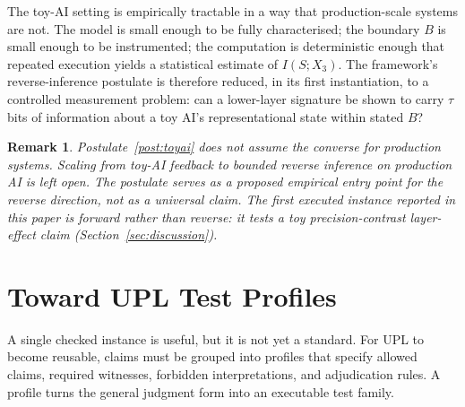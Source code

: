 \documentclass[11pt, a4paper]{article}
\theoremstyle{upldef}
\newtheorem{remark}{Remark}
\begin{document}
The toy-AI setting is empirically tractable in a way that
production-scale systems are not. The model is small enough to be
fully characterised; the boundary $B$ is small enough to be
instrumented; the computation is deterministic enough that repeated
execution yields a statistical estimate of $I(S; X_3)$. The
framework's reverse-inference postulate is therefore reduced, in its
first instantiation, to a controlled measurement problem: can a
lower-layer signature be shown to carry $\tau$ bits of information
about a toy AI's representational state within stated $B$?

\begin{remark}
Postulate~\ref{post:toyai} does not assume the converse for
production systems. Scaling from toy-AI feedback to bounded reverse
inference on production AI is left open. The postulate serves as a
proposed empirical entry point for the reverse direction, not as a
universal claim. The first executed instance reported in this paper
is forward rather than reverse: it tests a toy precision-contrast
layer-effect claim (Section~\ref{sec:discussion}).
\end{remark}

\section{Toward UPL Test Profiles}
\label{sec:profiles}

A single checked instance is useful, but it is not yet a standard.
For UPL to become reusable, claims must be grouped into profiles
that specify allowed claims, required witnesses, forbidden
interpretations, and adjudication rules. A profile turns the general
judgment form into an executable test family.
\end{document}
